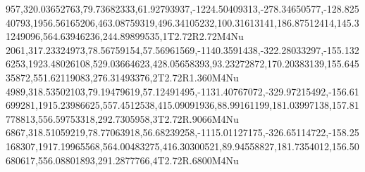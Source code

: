 957,320.03652763,79.73682333,61.92793937,-1224.50409313,-278.34650577,-128.82540793,1956.56165206,463.08759319,496.34105232,100.31613141,186.87512414,145.31249096,564.63946236,244.89899535,1T2.72R2.72M4Nu
2061,317.23324973,78.56759154,57.56961569,-1140.3591438,-322.28033297,-155.1326253,1923.48026108,529.03664623,428.05658393,93.23272872,170.20383139,155.64535872,551.62119083,276.31493376,2T2.72R1.360M4Nu
4989,318.53502103,79.19479619,57.12491495,-1131.40767072,-329.97215492,-156.61699281,1915.23986625,557.4512538,415.09091936,88.99161199,181.03997138,157.81778813,556.59753318,292.7305958,3T2.72R.9066M4Nu
6867,318.51059219,78.77063918,56.68239258,-1115.01127175,-326.65114722,-158.25168307,1917.19965568,564.00483275,416.30300521,89.94558827,181.7354012,156.50680617,556.08801893,291.2877766,4T2.72R.6800M4Nu
